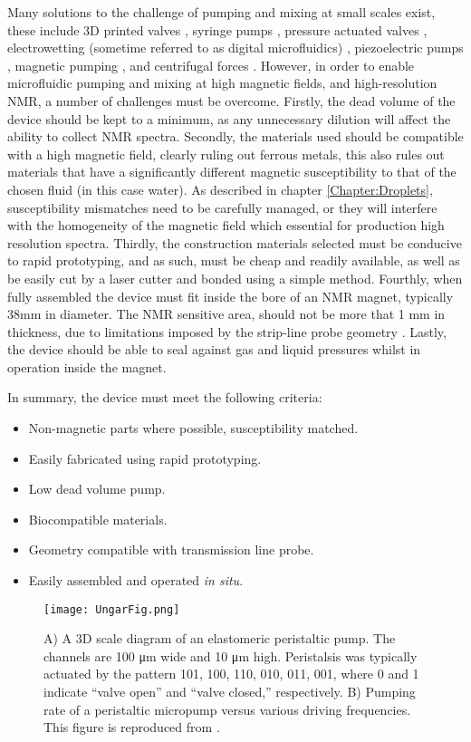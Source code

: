 Many solutions to the challenge of pumping and mixing at small scales exist, these include 3D printed valves
\citep{RN83, RN84},
syringe pumps \citep{RN85,RN86,RN87}, pressure actuated valves \citep{RN88, RN89, RN90}, electrowetting
(sometime referred to as digital microfluidics) \citep{RN91, RN92}, piezoelectric pumps \citep{RN93, RN94},
magnetic pumping \citep{RN95,RN96}, and centrifugal forces \citep{RN97, RN98, RN99}. However,
in order to enable microfluidic pumping and mixing at high magnetic fields, and high-resolution NMR, a
number of challenges must be overcome. Firstly, the dead volume of the device should be kept to a minimum,
as any unnecessary dilution will affect the ability to collect NMR spectra. Secondly, the materials used should be
compatible with a high magnetic field, clearly ruling out ferrous metals, this also rules out materials that
have a significantly different magnetic susceptibility to that of the chosen fluid (in this
case water). As described in chapter \ref{Chapter:Droplets}, susceptibility mismatches need to be carefully
managed, or they will interfere with the homogeneity of the magnetic field which
essential for production high resolution spectra. Thirdly, the construction materials selected must be
conducive to rapid prototyping, and as such, must be cheap and readily available, as well as
be easily cut by a laser cutter and bonded using a simple method. Fourthly, when fully assembled the device must
fit inside the bore of an NMR magnet, typically 38mm in diameter. The NMR sensitive area, should not be more
that 1 mm in thickness, due to limitations imposed by the strip-line probe geometry \citep{sharma2019modular}.
Lastly, the device should be able to seal against gas and liquid pressures whilst in operation
inside the magnet.

In summary, the device must meet the following criteria:
\begin{itemize}
  \item Non-magnetic parts where possible, susceptibility matched.
  \item Easily fabricated using rapid prototyping.
  \item Low dead volume pump.
  \item Biocompatible materials.
  \item Geometry compatible with transmission line probe.
  \item Easily assembled and operated \textit{in situ}.
\end{itemize}

\begin{figure}
\begin{center}
  \texttt{[image: UngarFig.png]}
\end{center}
  \caption{A) A 3D scale diagram of an elastomeric peristaltic pump. The channels are 100 μm wide and 10 μm high.
  Peristalsis was typically actuated by the pattern 101, 100, 110, 010, 011, 001, where 0 and 1 indicate “valve open”
  and “valve closed,” respectively. B) Pumping rate of a peristaltic micropump versus various driving frequencies. This
  figure is reproduced from \citep{RN59}.}
  \label{fig:Ungar}
\end{figure}

